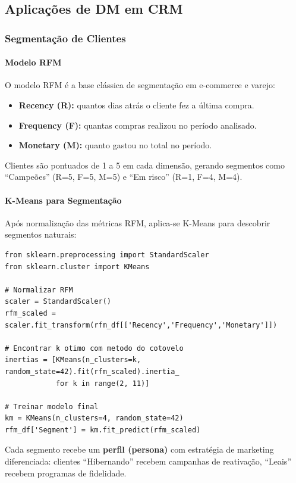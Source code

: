 \documentclass[12pt,a4paper]{article}
\begin{document}
\subsection{Aplicações de DM em CRM}

\subsubsection{Segmentação de Clientes}

\paragraph{Modelo RFM}

O modelo RFM é a base clássica de segmentação em e-commerce e varejo:
\begin{itemize}
  \item \textbf{Recency (R):} quantos dias atrás o cliente fez a última compra.
  \item \textbf{Frequency (F):} quantas compras realizou no período analisado.
  \item \textbf{Monetary (M):} quanto gastou no total no período.
\end{itemize}

Clientes são pontuados de 1 a 5 em cada dimensão, gerando segmentos como ``Campeões'' (R=5, F=5, M=5) e ``Em risco'' (R=1, F=4, M=4).

\paragraph{K-Means para Segmentação}

Após normalização das métricas RFM, aplica-se K-Means para descobrir segmentos naturais:
\begin{lstlisting}[caption={Segmentação K-Means sobre RFM}]
from sklearn.preprocessing import StandardScaler
from sklearn.cluster import KMeans

# Normalizar RFM
scaler = StandardScaler()
rfm_scaled = scaler.fit_transform(rfm_df[['Recency','Frequency','Monetary']])

# Encontrar k otimo com metodo do cotovelo
inertias = [KMeans(n_clusters=k, random_state=42).fit(rfm_scaled).inertia_
            for k in range(2, 11)]

# Treinar modelo final
km = KMeans(n_clusters=4, random_state=42)
rfm_df['Segment'] = km.fit_predict(rfm_scaled)
\end{lstlisting}

Cada segmento recebe um \textbf{perfil (persona)} com estratégia de marketing diferenciada: clientes ``Hibernando'' recebem campanhas de reativação, ``Leais'' recebem programas de fidelidade.
\end{document}
